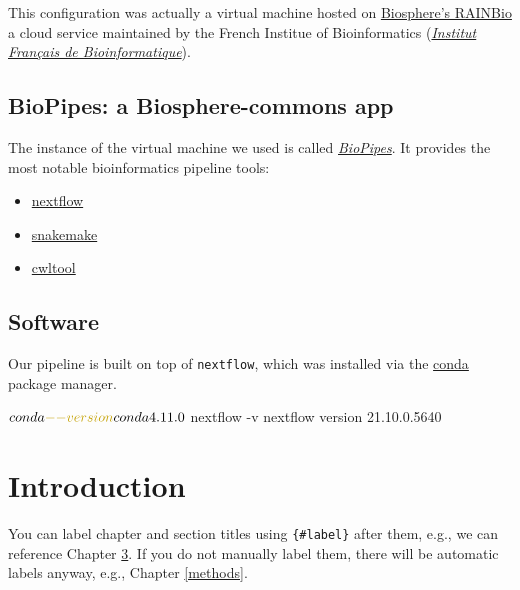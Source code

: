 \documentclass[
  openany]{book}
\newenvironment{Shaded}{\begin{snugshade}}{\end{snugshade}}
\newcommand{\AttributeTok}[1]{\textcolor[rgb]{0.77,0.63,0.00}{#1}}
\newcommand{\ExtensionTok}[1]{#1}
\newcommand{\NormalTok}[1]{#1}
\providecommand{\tightlist}{%
  \setlength{\itemsep}{0pt}\setlength{\parskip}{0pt}}
\begin{document}
This configuration was actually a virtual machine hosted on \href{https://biosphere.france-bioinformatique.fr/catalogue/}{Biosphere's RAINBio} a cloud service maintained by the French Institue of Bioinformatics (\href{https://www.france-bioinformatique.fr/en/home/}{\emph{Institut Français de Bioinformatique}}).

\hypertarget{biopipes-a-biosphere-commons-app}{%
\section{BioPipes: a Biosphere-commons app}\label{biopipes-a-biosphere-commons-app}}

The instance of the virtual machine we used is called \href{https://biosphere.france-bioinformatique.fr/catalogue/appliance/119/}{\emph{BioPipes}}. It provides the most notable bioinformatics pipeline tools:

\begin{itemize}
\tightlist
\item
  \href{https://www.nextflow.io/}{nextflow}
\item
  \href{https://snakemake.github.io/}{snakemake}
\item
  \href{https://www.commonwl.org/}{cwltool}
\end{itemize}

\hypertarget{software}{%
\section{Software}\label{software}}

Our pipeline is built on top of \texttt{nextflow}, which was installed via the \href{https://www.anaconda.com/products/individual}{conda} package manager.

\begin{Shaded}
\begin{Highlighting}[]
\ExtensionTok{$}\NormalTok{ conda }\AttributeTok{{-}{-}version}
\ExtensionTok{conda}\NormalTok{ 4.11.0}
\ExtensionTok{$}\NormalTok{ nextflow }\AttributeTok{{-}v}
\ExtensionTok{nextflow}\NormalTok{ version 21.10.0.5640}
\end{Highlighting}
\end{Shaded}

\hypertarget{intro}{%
\chapter{Introduction}\label{intro}}

You can label chapter and section titles using \texttt{\{\#label\}} after them, e.g., we can reference Chapter \ref{intro}. If you do not manually label them, there will be automatic labels anyway, e.g., Chapter \ref{methods}.
\end{document}
